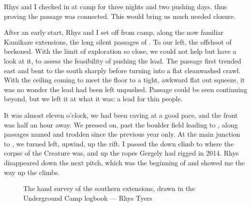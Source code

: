 Rhys and I checked in at camp  for three nights and two pushing days.  thus proving the passage was connected. This would bring us much needed closure.

After an early start, Rhys and I set off from camp, along the now familiar Kamikaze extensions, the long silent passages of . To our left, the offshoot of  beckoned. With the limit of exploration so close, we could not help but have a look at it, to assess the feasibility of pushing the lead. The passage first trended east and bent to the south sharply before turning into a flat cleanwashed crawl. With the ceiling coming to meet the floor to a tight, awkward flat out squeeze, it was no wonder the lead had been left unpushed. Passage could be seen continuing beyond, but we left it at what it was: a lead for thin people.

It was almost eleven o'clock, we had been caving at a good pace, and the front was half an hour away. We pressed on, past the boulder field leading to , along passages named and trodden since the previous year only. At the main junction to , we turned left, upwind, up the rift. I passed the down climb to  where the corpse of the Creature was, and up the ropes Gergely had rigged in 2014. Rhys disappeared down the next pitch, which was the beginning of  and showed me the way up the climbs.

\begin{figure}[t!]
\checkoddpage \ifoddpage \forcerectofloat \else \forceversofloat \fi
\centering
{}
\caption{The hand survey of the southern extensions, drawn in the Underground Camp logbook --- Rhys Tyers}
\label{Notebook}
\end{figure}

